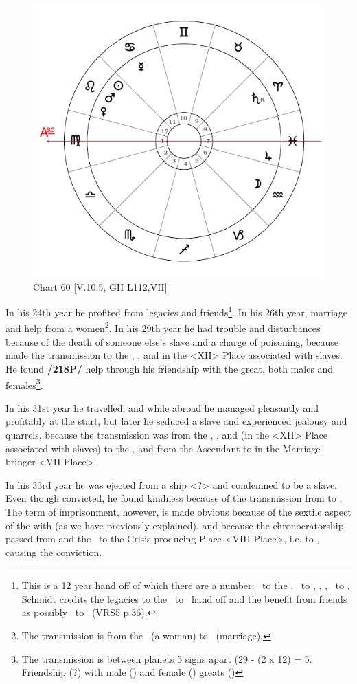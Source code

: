 \begin{figure}
\centering
\vspace{-20pt}
\includegraphics[width=.68\textwidth]{charts/5_10_05}
\caption{Chart 60 [V.10.5, GH L112,VII]}
\label{fig:chart60}
\end{figure}


In his 24th year he profited from legacies and friends\footnote{This is a 12 year hand off of which there are a number: \Jupiter\, to the \Moon, \Saturn\, to \Jupiter,  \Venus, \Mars, \Sun\, to \Mercury. Schmidt credits the legacies to the \Saturn\, to \Jupiter\, hand off and the benefit from friends as possibly \Venus\, to \Mercury\, (VRS5 p.36).}. In his 26th year, marriage and help from a women\footnote{The transmission is from the \Moon\, (a woman) to \Jupiter\, (marriage).}. In his 29th year he had trouble and disturbances because of the death of someone else’s slave and a charge of poisoning, because \Saturn\xspace made the transmission to the \Sun, \Mars, and \Venus\xspace in the <XII> Place associated with slaves. He found \textbf{/218P/} help through his friendship with the great, both males and females\footnote{The transmission is between planets 5 signs apart (29 - (2 x 12) = 5. Friendship (\Venus?) with male (\Mars) and female (\Venus) greats (\Sun)}. 

In his 31st year he travelled, and while abroad he managed pleasantly and profitably at the start, but later he seduced a slave and experienced jealousy and quarrels, because the transmission was from the \Sun, \Venus, and \Mars (in the <XII> Place associated with slaves) to the \Moon, and from the Ascendant to \Jupiter\xspace in the Marriage-bringer <VII Place>. 

In his 33rd year he was ejected from a ship <?> and condemned to be a slave. Even though convicted, he found kindness because
of the transmission from \Mercury\xspace to \Jupiter. The term of imprisonment, however, is made obvious because of the sextile aspect of the \Moon\xspace with \Saturn\xspace (as we have previously explained), and because the chronocratorship passed from \Mars\xspace and the \Sun\, to the Crisis-producing Place <VIII Place>, i.e. to \Saturn, causing the conviction. 

